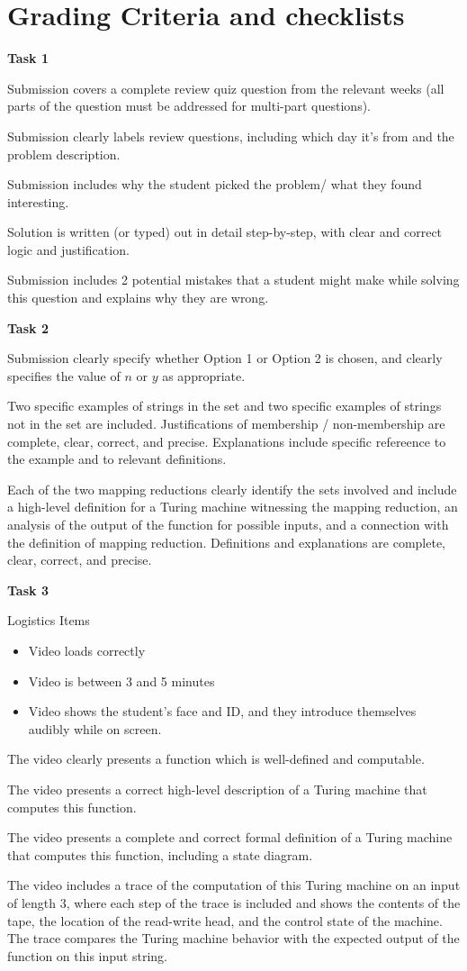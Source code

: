 \documentclass[12pt, oneside]{article}
\begin{document}
	
\section{Grading Criteria and checklists}

{\bf Task 1}

Submission covers a complete review quiz question from the relevant weeks 
(all parts of the question must be addressed for multi-part questions).

Submission clearly labels review questions, including which day it's from and the problem description.

Submission includes why the student picked the problem/ what they found interesting.

Solution is written (or typed) out in detail step-by-step, with clear and correct logic and justification.

Submission includes 2 potential mistakes that a student might make while solving this question 
and explains why they are wrong.


{\bf Task 2}

Submission clearly specify whether Option 1 or Option 2 is chosen, and clearly specifies the value of $n$ or $y$ as appropriate.

Two specific examples of strings in the set and two specific examples 
of strings not in the set are included. Justifications of membership / non-membership are complete, clear, correct, and precise.
Explanations include specific refereence to the example and to relevant definitions.

Each of the two mapping reductions clearly identify the sets involved and include a high-level definition for
a Turing machine witnessing the mapping reduction, an analysis of the output of the function for possible inputs, and
a connection with the definition of mapping reduction. Definitions and explanations are complete, clear, correct, and precise.	


{\bf Task 3}

Logistics Items
\begin{itemize}
    \item Video loads correctly
    \item Video is between 3 and 5 minutes
    \item Video shows the student's face and ID, and they 
	introduce themselves audibly while on screen.
\end{itemize}

The video clearly presents a function which is well-defined and computable.

The video presents a correct high-level description of a Turing machine that computes this function.

The video presents a complete and correct formal definition of a Turing machine that computes this function,
including a state diagram.

The video includes a trace of the computation of this Turing machine on an input of length $3$, where
each step of the trace is included and shows the contents of the tape, the location of the read-write head, and 
the control state of the machine. The trace compares the Turing machine behavior with the expected output
of the function on this input string.

\newpage
\end{document}

